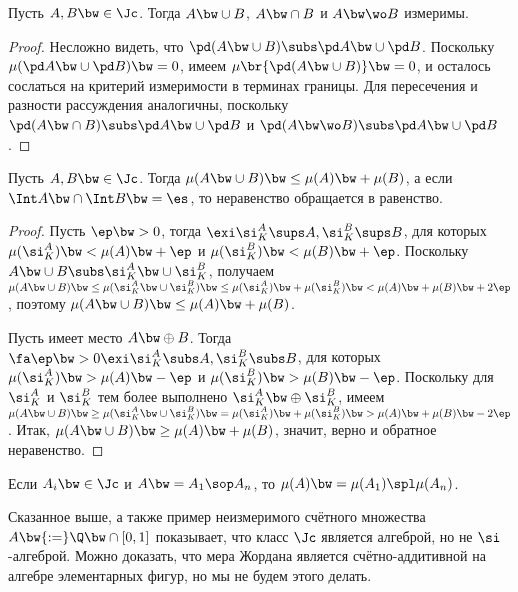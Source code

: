 \documentclass[a4paper]{article}
\begin{document}
\begin{theorem}
Пусть $A, B \bw\in \Jc$. Тогда $A \bw\cup B$, $A \bw\cap B$ и $A \bw\wo B$ измеримы.
\end{theorem}
\begin{proof}
Несложно видеть, что $\pd(A \bw\cup B) \subs \pd A \bw\cup \pd B$. Поскольку $\mu(\pd A \bw\cup \pd B) \bw= 0$, имеем
$\mu\br{\pd(A \bw\cup B)} \bw= 0$, и осталось сослаться на критерий измеримости в терминах границы.
Для пересечения и разности рассуждения аналогичны, поскольку $\pd(A \bw\cap B) \subs \pd A \bw\cup \pd B$ и
$\pd(A \bw\wo B) \subs \pd A \bw\cup \pd B$.
\end{proof}

\begin{theorem}
Пусть $A, B \bw\in \Jc$. Тогда $\mu(A \bw\cup B) \bw\le \mu(A) \bw+ \mu(B)$, а если
$\Int A \bw\cap \Int B \bw= \es$, то неравенство
обращается в равенство.
\end{theorem}
\begin{proof}
Пусть $\ep \bw> 0$, тогда $\exi \si_K^A \sups A, \si_K^B \sups B$, для которых $\mu(\si_K^A) \bw< \mu(A)
\bw+ \ep$ и $\mu(\si_K^B) \bw< \mu(B) \bw+ \ep$. Поскольку $A \bw\cup B \subs \si_K^A \bw\cup \si_K^B$, получаем
$\mu(A \bw\cup B) \bw\le \mu(\si_K^A \bw\cup \si_K^B) \bw\le \mu(\si_K^A) \bw+
\mu(\si_K^B) \bw< \mu(A) \bw+ \mu(B) \bw+ 2\ep$, поэтому $\mu(A \bw\cup B) \bw\le \mu(A) \bw+ \mu(B)$.

Пусть имеет место $A \bw\oplus B$. Тогда $\fa \ep \bw> 0 \exi \si_K^A \subs A, \si_K^B \subs B$, для
которых $\mu(\si_K^A) \bw> \mu(A) \bw- \ep$ и $\mu(\si_K^B) \bw> \mu(B) \bw- \ep$. Поскольку для $\si_K^A$ и
$\si_K^B$ тем более выполнено $\si_K^A \bw\oplus \si_K^B$, имеем $\mu(A \bw\cup B) \bw\ge \mu(\si_K^A \bw\cup
\si_K^B) \bw= \mu(\si_K^A) \bw+ \mu(\si_K^B) \bw> \mu(A) \bw+ \mu(B) \bw- 2\ep$. Итак,
$\mu(A \bw\cup B) \bw\ge \mu(A) \bw+ \mu(B)$, значит, верно и обратное неравенство.
\end{proof}

\begin{imp}
Если $A_i \bw\in \Jc$ и $A \bw= A_1 \sop A_n$, то $\mu(A) \bw= \mu(A_1)\spl\mu(A_n)$.
\end{imp}

\begin{note}
Сказанное выше, а также пример неизмеримого счётного множества $A \bw{:=}\Q \bw\cap [0,1]$ показывает,
что класс $\Jc$ является алгеброй, но не $\si$-алгеброй. Можно доказать, что мера Жордана является
счётно-аддитивной на алгебре элементарных фигур, но мы не будем этого делать.
\end{note}
\end{document}
